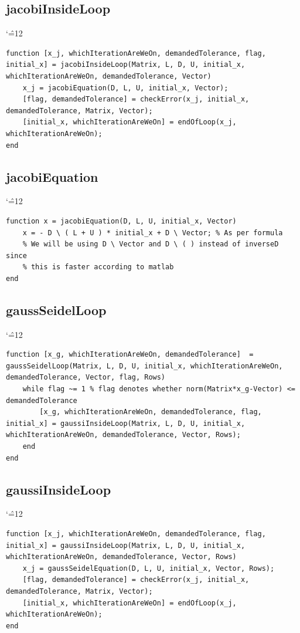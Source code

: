 \documentclass[12pt]{report}
\newenvironment{simplechar}{%
   \catcode`\^=12
}{}
\begin{document}
\subsection{jacobiInsideLoop}
\begin{simplechar}
\begin{lstlisting}
function [x_j, whichIterationAreWeOn, demandedTolerance, flag, initial_x] = jacobiInsideLoop(Matrix, L, D, U, initial_x, whichIterationAreWeOn, demandedTolerance, Vector)
    x_j = jacobiEquation(D, L, U, initial_x, Vector);
    [flag, demandedTolerance] = checkError(x_j, initial_x, demandedTolerance, Matrix, Vector);
    [initial_x, whichIterationAreWeOn] = endOfLoop(x_j, whichIterationAreWeOn);
end
\end{lstlisting}
\end{simplechar}

\subsection{jacobiEquation}
\begin{simplechar}
\begin{lstlisting}
function x = jacobiEquation(D, L, U, initial_x, Vector)
    x = - D \ ( L + U ) * initial_x + D \ Vector; % As per formula
    % We will be using D \ Vector and D \ ( ) instead of inverseD since
    % this is faster according to matlab
end
\end{lstlisting}
\end{simplechar}

\subsection{gaussSeidelLoop}
\begin{simplechar}
\begin{lstlisting}
function [x_g, whichIterationAreWeOn, demandedTolerance]  = gaussSeidelLoop(Matrix, L, D, U, initial_x, whichIterationAreWeOn, demandedTolerance, Vector, flag, Rows)
    while flag ~= 1 % flag denotes whether norm(Matrix*x_g-Vector) <= demandedTolerance
        [x_g, whichIterationAreWeOn, demandedTolerance, flag, initial_x] = gaussiInsideLoop(Matrix, L, D, U, initial_x, whichIterationAreWeOn, demandedTolerance, Vector, Rows);
    end
end
\end{lstlisting}
\end{simplechar}

\subsection{gaussiInsideLoop}
\begin{simplechar}
\begin{lstlisting}
function [x_j, whichIterationAreWeOn, demandedTolerance, flag, initial_x] = gaussiInsideLoop(Matrix, L, D, U, initial_x, whichIterationAreWeOn, demandedTolerance, Vector, Rows)
    x_j = gaussSeidelEquation(D, L, U, initial_x, Vector, Rows);
    [flag, demandedTolerance] = checkError(x_j, initial_x, demandedTolerance, Matrix, Vector);
    [initial_x, whichIterationAreWeOn] = endOfLoop(x_j, whichIterationAreWeOn);
end
\end{lstlisting}
\end{simplechar}
\end{document}
